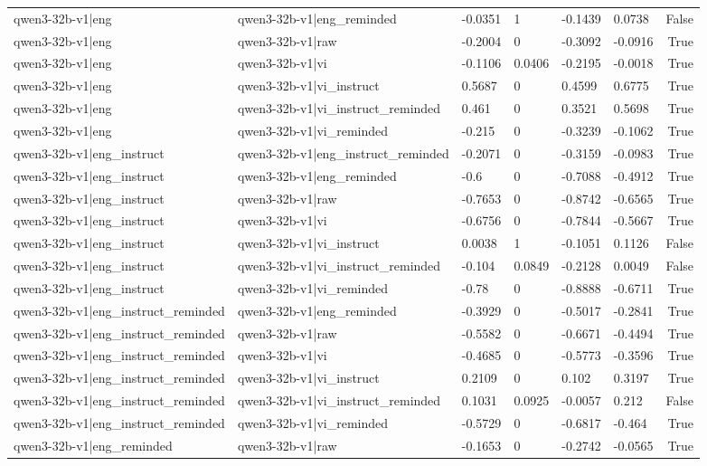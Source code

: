 \begin{table}
\begin{tabular}{llllllr}
qwen3-32b-v1|eng & qwen3-32b-v1|eng_reminded & -0.0351 & 1 & -0.1439 & 0.0738 & False \\
qwen3-32b-v1|eng & qwen3-32b-v1|raw & -0.2004 & 0 & -0.3092 & -0.0916 & True \\
qwen3-32b-v1|eng & qwen3-32b-v1|vi & -0.1106 & 0.0406 & -0.2195 & -0.0018 & True \\
qwen3-32b-v1|eng & qwen3-32b-v1|vi_instruct & 0.5687 & 0 & 0.4599 & 0.6775 & True \\
qwen3-32b-v1|eng & qwen3-32b-v1|vi_instruct_reminded & 0.461 & 0 & 0.3521 & 0.5698 & True \\
qwen3-32b-v1|eng & qwen3-32b-v1|vi_reminded & -0.215 & 0 & -0.3239 & -0.1062 & True \\
qwen3-32b-v1|eng_instruct & qwen3-32b-v1|eng_instruct_reminded & -0.2071 & 0 & -0.3159 & -0.0983 & True \\
qwen3-32b-v1|eng_instruct & qwen3-32b-v1|eng_reminded & -0.6 & 0 & -0.7088 & -0.4912 & True \\
qwen3-32b-v1|eng_instruct & qwen3-32b-v1|raw & -0.7653 & 0 & -0.8742 & -0.6565 & True \\
qwen3-32b-v1|eng_instruct & qwen3-32b-v1|vi & -0.6756 & 0 & -0.7844 & -0.5667 & True \\
qwen3-32b-v1|eng_instruct & qwen3-32b-v1|vi_instruct & 0.0038 & 1 & -0.1051 & 0.1126 & False \\
qwen3-32b-v1|eng_instruct & qwen3-32b-v1|vi_instruct_reminded & -0.104 & 0.0849 & -0.2128 & 0.0049 & False \\
qwen3-32b-v1|eng_instruct & qwen3-32b-v1|vi_reminded & -0.78 & 0 & -0.8888 & -0.6711 & True \\
qwen3-32b-v1|eng_instruct_reminded & qwen3-32b-v1|eng_reminded & -0.3929 & 0 & -0.5017 & -0.2841 & True \\
qwen3-32b-v1|eng_instruct_reminded & qwen3-32b-v1|raw & -0.5582 & 0 & -0.6671 & -0.4494 & True \\
qwen3-32b-v1|eng_instruct_reminded & qwen3-32b-v1|vi & -0.4685 & 0 & -0.5773 & -0.3596 & True \\
qwen3-32b-v1|eng_instruct_reminded & qwen3-32b-v1|vi_instruct & 0.2109 & 0 & 0.102 & 0.3197 & True \\
qwen3-32b-v1|eng_instruct_reminded & qwen3-32b-v1|vi_instruct_reminded & 0.1031 & 0.0925 & -0.0057 & 0.212 & False \\
qwen3-32b-v1|eng_instruct_reminded & qwen3-32b-v1|vi_reminded & -0.5729 & 0 & -0.6817 & -0.464 & True \\
qwen3-32b-v1|eng_reminded & qwen3-32b-v1|raw & -0.1653 & 0 & -0.2742 & -0.0565 & True \\

\end{tabular}
\end{table}
